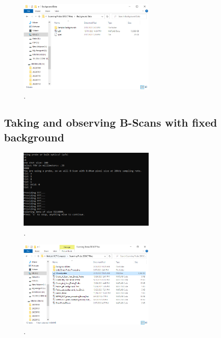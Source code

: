 \documentclass{article}
\begin{document}
\begin{figure}[!h]
	\centering
	\includegraphics[width=0.6\textwidth]{Data for Probe Writeup/spec location.png}
	\caption{.}
\end{figure}

\subsection{Taking and observing B-Scans with fixed background}

\par{}

\begin{figure}[!h]
	\centering
	\includegraphics[width=0.6\textwidth]{Data for Probe Writeup/BMode Probe.png}
	\caption{.}
\end{figure}

\begin{figure}[!h]
	\centering
	\includegraphics[width=0.6\textwidth]{Data for Probe Writeup/BScan location.png}
	\caption{.}
\end{figure}
\end{document}
